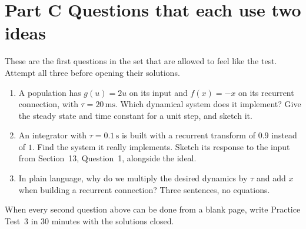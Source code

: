\documentclass[11pt,letterpaper]{article}
\begin{document}
\part*{Part C \quad Questions that each use two ideas}

\begin{trythis}
These are the first questions in the set that are allowed to feel like the test. Attempt all three before opening their solutions.
\end{trythis}

\begin{enumerate}
\item A population has $g(u) = 2u$ on its input and $f(x) = -x$ on its recurrent connection, with $\tau = 20\,\mathrm{ms}$. Which dynamical system does it implement? Give the steady state and time constant for a unit step, and sketch it.
\item An integrator with $\tau = 0.1\,\mathrm{s}$ is built with a recurrent transform of $0.9$ instead of $1$. Find the system it really implements. Sketch its response to the input from Section~13, Question~1, alongside the ideal.
\item In plain language, why do we multiply the desired dynamics by $\tau$ and add $x$ when building a recurrent connection? Three sentences, no equations.
\end{enumerate}

\vspace{8pt}
When every second question above can be done from a blank page, write Practice Test~3 in 30 minutes with the solutions closed.
\end{document}
